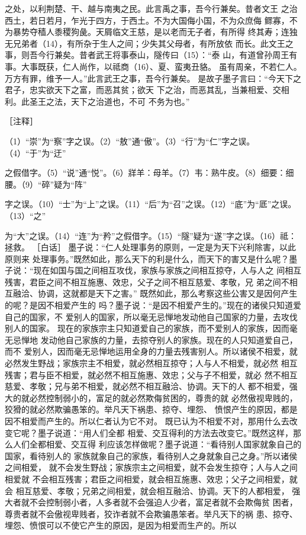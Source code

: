 \documentclass[12pt,UTF8]{ctexbook}
\begin{document}
之处，以利荆楚、干、越与南夷之民。此言禹之事，吾今行兼矣。昔者文王 
之治西土，若日若月，乍光于四方，于西土。不为大国侮小国，不为众庶侮 
鳏寡，不为暴势夺穑人黍稷狗彘。天屑临文王慈，是以老而无子者，有所得 
终其寿；连独无兄弟者（14），有所杂于生人之间；少失其父母者，有所放依 
而长。此文王之事，则吾今行兼矣。昔者武王将事泰山，隧传曰（15）：“泰 
山，有道曾孙周王有事。大事既获，仁人尚作，以祗商（16）、夏、蛮夷丑貉。 
虽有周亲，不若仁人。万方有罪，维予一人。”此言武王之事，吾今行兼矣。 
是故子墨子言曰：“今天下之君子，忠实欲天下之富，而恶其贫；欲天 
下之治，而恶其乱，当兼相爱、交相利。此圣王之法，天下之治道也，不可 
不务为也。” 


［注释］ 

（1）“崇”为“察”字之误。（2）“敖”通“傲”。（3）“行”为“仁”字之误。（4）“于”为“迂” 

之假借字。（5）“说”通“悦”。（6）牂羊：母羊。（7）韦：熟牛皮。（8）细要：细腰。（9）“碎”疑为“阵” 

字之误。（10）“士”为“上”之误。（11）“后”为“召”之误。（12）“底”为“厎”之误。（13）“之” 

为“大”之误。（14）“连”为“矜”之假借字。（15）“隧”疑为“遂”字之误。（16）祗：拯救。 
［白话］ 
墨子说：“仁人处理事务的原则，一定是为天下兴利除害，以此原则来 
处理事务。”既然如此，那么天下的利是什么，而天下的害又是什么呢？墨 
子说：“现在如国与国之间相互攻伐，家族与家族之间相互掠夺，人与人之 
间相互残害，君臣之间不相互施惠、效忠，父子之间不相互慈爱、孝敬，兄 
弟之间不相互融洽、协调，这就都是天下之害。” 
既然如此，那么考察这些公害又是因何产生的呢？是因不相爱产生的 
吗？墨子说：“是因不相爱产生的。”现在的诸侯只知道爱自己的国家，不 
爱别人的国家，所以毫无忌惮地发动他自己国家的力量，去攻伐别人的国家。 
现在的家族宗主只知道爱自己的家族，而不爱别人的家族，因而毫无忌惮地 
发动他自己家族的力量，去掠夺别人的家族。现在的人只知道爱自己，而不 
爱别人，因而毫无忌惮地运用全身的力量去残害别人。所以诸侯不相爱，就 
必然发生野战；家族宗主不相爱，就必然相互掠夺；人与人不相爱，就必然 
相互残害；君与臣不相爱，就必然不相互施惠、效忠；父与子不相爱，就必 
然不相互慈爱、孝敬；兄与弟不相爱，就必然不相互融洽、协调。天下的人 
都不相爱，强大的就必然控制弱小的，富足的就必然欺侮贫困的，尊贵的就 
必然傲视卑贱的，狡猾的就必然欺骗愚笨的。举凡天下祸患、掠夺、埋怨、 
愤恨产生的原因，都是因不相爱而产生的。所以仁者认为它不对。 
既已认为不相爱不对，那用什么去改变它呢？墨子说道：“用人们全都 
相爱、交互得利的方法去改变它。”既然这样，那么人们全都相爱、交互得 
利应该怎样做呢？墨子说道：“看待别人国家就象自己的国家，看待别人的 
家族就象自己的家族，看待别人之身就象自己之身。”所以诸侯之间相爱， 
就不会发生野战；家族宗主之间相爱，就不会发生掠夺；人与人之间相爱就 
不会相互残害；君臣之间相爱，就会相互施惠、效忠；父子之间相爱，就会 
相互慈爱、孝敬；兄弟之间相爱，就会相互融洽、协调。天下的人都相爱， 
强大者就不会控制弱小者，人多者就不会强迫人少者，富足者就不会欺侮贫 
困者，尊贵者就不会傲视卑贱者，狡诈者就不会欺骗愚笨者。举凡天下的祸 
患、掠夺、埋怨、愤恨可以不使它产生的原因，是因为相爱而生产的。所以 
\end{document}
